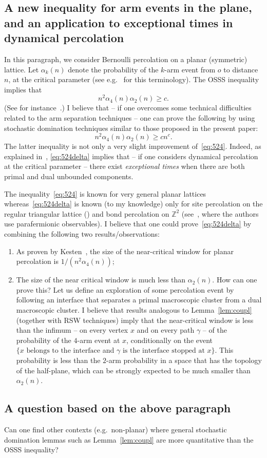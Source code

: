 \documentclass[AHL,Unicode,longabstracts,published]{cedram}
\newcommand{\Z}{\mathbb{Z}}
\begin{document}
\subsection{A new inequality for arm events in the plane, and an application to exceptional times in dynamical percolation}
In this paragraph, we consider Bernoulli percolation on a planar (symmetric) lattice. Let $\alpha_k(n)$ denote the probability of the $k$-arm event from $o$ to distance $n$, at the critical parameter (see e.g.~\cite[Chapter~2]{GS14} for this terminology). The OSSS inequality implies that
\begin{equation}\label{eq:524}
n^2\alpha_4(n)\alpha_2(n) \ge c.
\end{equation}
(See for instance~\cite[Chapter~12, Theorem~40]{GS14}.) I believe that -- if one overcomes some technical difficulties related to the arm separation techniques -- one can prove the following by using stochastic domination techniques similar to those proposed in the present paper:
\begin{equation}\label{eq:524delta}
n^2 \alpha_4(n)\alpha_2(n) \ge cn^c.
\end{equation}
The latter inequality is not only a very slight improvement of~\eqref{eq:524}. Indeed, as explained in~\cite{TV22}, \eqref{eq:524delta} implies that -- if one considers dynamical percolation at the critical parameter -- there exist \emph{exceptional times} when there are both primal and dual unbounded components.


The inequality~\eqref{eq:524} is known for very general planar lattices whereas~\eqref{eq:524delta} is known (to my knowledge) only for site percolation on the regular triangular lattice (\cite{SW01}) and bond percolation on $\Z^2$ (see~\cite{DMT21}, where the authors use parafermionic observables). I believe that one could prove~\eqref{eq:524delta} by combining the following two results/observations:
\begin{enumerate}
\item As proven by Kesten~\cite{Kes81}, the size of the near-critical window for planar percolation is $1/(n^2\alpha_4(n))$;
\item The size of the near critical window is much less than $\alpha_2(n)$. How can one prove this? Let us define an exploration of some percolation event by following an interface that separates a primal macroscopic cluster from a dual macroscopic cluster. I believe that results analogous to Lemma~\ref{lem:coupl} (together with RSW techniques) imply that the near-critical window is less than the infimum -- on every vertex $x$ and on every path $\gamma$ -- of the probability of the $4$-arm event at $x$, conditionally on the event $\{x \text{ belongs to the interface}$ and $\text{$\gamma$ is the interface stopped at $x$}\}$. This probability is less than the $2$-arm probability in a space that has the topology of the half-plane, which can be strongly expected to be much smaller than $\alpha_2(n)$.
\end{enumerate}

\subsection{A question based on the above paragraph}

Can one find other contexts (e.g.\ non-planar) where general stochastic domination lemmas such as Lemma~\ref{lem:coupl} are more quantitative than the OSSS inequality?



\end{document}
